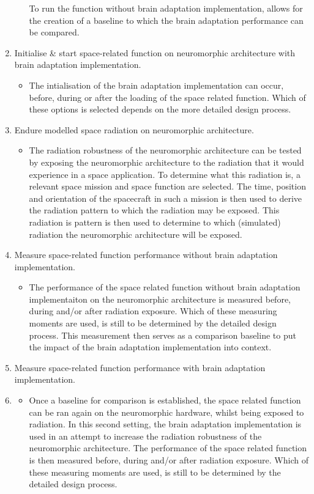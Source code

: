 \begin{enumerate}
\begin{itemize}
        To run the function without brain adaptation implementation, allows for the creation of a baseline to which the brain adaptation performance can be compared.
    \end{itemize}
    \item Initialise \& start space-related function on neuromorphic architecture with brain adaptation implementation.
    \begin{itemize}
        \item The intialisation of the brain adaptation implementation can occur, before, during or after the loading of the space related function. Which of these options is selected depends on the more detailed design process.
    \end{itemize}
    \item Endure modelled space radiation on neuromorphic architecture.
    \begin{itemize}
        \item The radiation robustness of the neuromorphic architecture can be tested by exposing the neuromorphic architecture to the radiation that it would experience in a space application. To determine what this radiation is, a relevant space mission and space function are selected. The time, position and orientation of the spacecraft in such a mission is then used to derive the radiation pattern to which the radiation may be exposed. This radiation is pattern is then used to determine to which (simulated) radiation the neuromorphic architecture will be exposed.
    \end{itemize}
    \item Measure space-related function performance without brain adaptation implementation.
    \begin{itemize}
        \item The performance of the space related function without brain adaptation implementaiton on the neuromorphic architecture is measured before, during and/or after radiation exposure. Which of these measuring moments are used, is still to be determined by the detailed design process. This measurement then serves as a comparison baseline to put the impact of the brain adaptation implementation into context.
    \end{itemize}
    \item Measure space-related function performance with brain adaptation implementation.
    \item \begin{itemize}
        \item Once a baseline for comparison is established, the space related function can be ran again on the neuromorphic hardware, whilst being exposed to radiation. In this second setting, the brain adaptation implementation is used in an attempt to increase the radiation robustness of the neuromorphic architecture. The performance of the space related function is then measured before, during and/or after radiation exposure. Which of these measuring moments are used, is still to be determined by the detailed design process. 

\end{itemize}
\end{enumerate}
